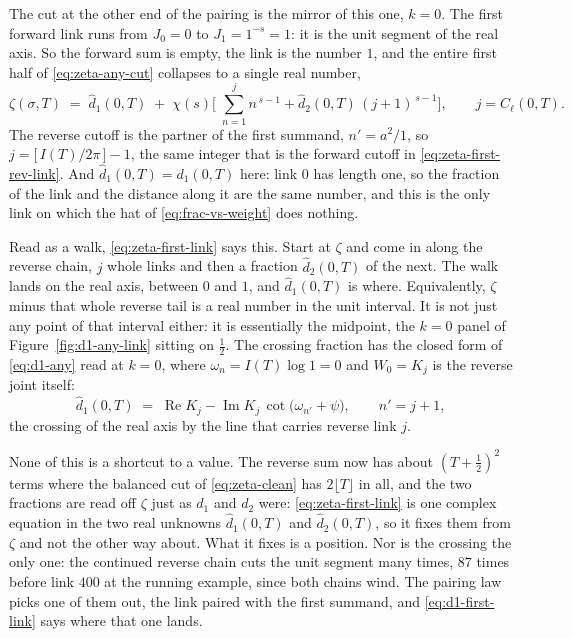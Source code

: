 \documentclass[11pt]{article}
\theoremstyle{definition}
\begin{document}
The cut at the other end of the pairing is the mirror of this one, $k=0$.
The first forward link runs from $J_0=0$ to
$J_1=1^{-s}=1$: it is the unit segment of the real axis. So the forward sum is
empty, the link is the number $1$, and the entire first half of
\eqref{eq:zeta-any-cut} collapses to a single real number,
\begin{equation}\label{eq:zeta-first-link}
\zeta(\sigma,T)
\;=\;
\hat d_1(0,T)
\;+\;\chi(s)\Biggl[\;\sum_{n=1}^{j}n^{\,s-1}+\hat d_2(0,T)\,(j+1)^{\,s-1}\Biggr],
\qquad j=C_{\ell}(0,T).
\end{equation}
The reverse cutoff is the partner of the first summand, $n'=a^{2}/1$, so
$j=\bigl[\,I(T)/2\pi\,\bigr]-1$, the same integer that is the forward
cutoff in \eqref{eq:zeta-first-rev-link}. And
$\hat d_1(0,T)=d_1(0,T)$ here: link $0$ has length one, so the fraction of the
link and the distance along it are the same number, and this is the only link
on which the hat of \eqref{eq:frac-vs-weight} does nothing.

Read as a walk, \eqref{eq:zeta-first-link} says this. Start at $\zeta$ and come
in along the reverse chain, $j$ whole links and then a fraction
$\hat d_2(0,T)$ of the next. The walk lands on the real axis, between $0$ and
$1$, and $\hat d_1(0,T)$ is where. Equivalently, $\zeta$ minus that whole
reverse tail is a real number in the unit interval. It is not just any point of
that interval either: it is essentially the midpoint, the $k=0$ panel of
Figure~\ref{fig:d1-any-link} sitting on $\tfrac12$. The crossing fraction has
the closed form of \eqref{eq:d1-any} read at $k=0$, where
$\omega_n=I(T)\log1=0$ and $W_0=K_j$ is the reverse joint itself:
\begin{equation}\label{eq:d1-first-link}
\hat d_1(0,T)
\;=\;
\operatorname{Re}K_j-\operatorname{Im}K_j\,\cot\bigl(\omega_{n'}+\psi\bigr),
\qquad n'=j+1,
\end{equation}
the crossing of the real axis by the line that carries reverse link $j$.

None of this is a shortcut to a value. The reverse sum now has about
$(T+\tfrac12)^{2}$ terms where the balanced cut of \eqref{eq:zeta-clean} has
$2\lfloor T\rfloor$ in all, and the two fractions are read off $\zeta$ just as
$d_1$ and $d_2$ were: \eqref{eq:zeta-first-link} is one complex equation in the
two real unknowns $\hat d_1(0,T)$ and $\hat d_2(0,T)$, so it fixes them from
$\zeta$ and not the other way about. What it fixes is a position. Nor is the
crossing the only one: the continued reverse chain cuts the unit segment many
times, $87$ times before link $400$ at the running example, since both chains
wind. The pairing law picks one of them out, the link paired with the first
summand, and \eqref{eq:d1-first-link} says where that one lands.
\end{document}
